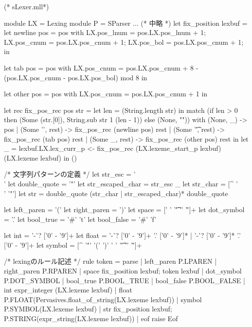 \documentclass[mingoth,a4paper]{jsarticle}
\begin{document}
\begin{commandline}
{
  (* sLexer.mll*)

  module LX = Lexing
  module P = SParser
  ... (* 中略 *)
  let fix_position lexbuf =
    let newline pos = {
      pos with
	LX.pos_lnum = pos.LX.pos_lnum + 1;
	LX.pos_cnum = pos.LX.pos_cnum + 1;
	LX.pos_bol = pos.LX.pos_cnum + 1;
    } in

    let tab pos = {
      pos with
	LX.pos_cnum = pos.LX.pos_cnum + 8 - (pos.LX.pos_cnum - pos.LX.pos_bol) mod 8
    } in

    let other pos = {
      pos with
	LX.pos_cnum = pos.LX.pos_cnum + 1
    } in

    let rec fix_pos_rec pos str =
      let len = (String.length str) in
	match (if len > 0 then (Some (str.[0]), String.sub str 1 (len - 1))
	       else (None, "")) with
	    (None, _) -> pos
	  | (Some '\n', rest) -> fix_pos_rec (newline pos) rest
	  | (Some '\t', rest) -> fix_pos_rec (tab pos) rest
	  | (Some _, rest) -> fix_pos_rec (other pos) rest
    in
    let _ = lexbuf.LX.lex_curr_p <- fix_pos_rec (LX.lexeme_start_p lexbuf) (LX.lexeme lexbuf) in
      ()
}

/* 文字列パターンの定義 */
let str_esc = '\\'
let double_quote = '"'
let str_escaped_char = str_esc _
let str_char = [^ '\\' '"']
let str = double_quote (str_char | str_escaped_char)* double_quote

let left_paren = '('
let right_paren = ')'
let space = [' ' '\t' '\n' '\r']+
let dot_symbol = '.'
let bool_true  = '#' 't'
let bool_false = '#' 'f'

let int = '-'? ['0' - '9']+
let float = '-'? ['0' - '9']+ '.' ['0' - '9']* | '-'? ['0' - '9']* '.' ['0' - '9']+
let symbol = [^ '"' '(' ')' ' ' '\t' '\n' '\r']+

/* lexingのルール記述 */
rule token = parse
  | left_paren      { P.LPAREN }
  | right_paren     { P.RPAREN }
  | space      { fix_position lexbuf; token lexbuf }
  | dot_symbol      { P.DOT_SYMBOL }
  | bool_true       { P.BOOL_TRUE }
  | bool_false      { P.BOOL_FALSE }
  | int      { expr_integer (LX.lexeme lexbuf) }
  | float    { P.FLOAT(Pervasives.float_of_string(LX.lexeme lexbuf)) }
  | symbol   { P.SYMBOL(LX.lexeme lexbuf) }
  | str      { fix_position lexbuf; P.STRING(expr_string(LX.lexeme lexbuf)) }
  | eof      { raise Eof }

\end{commandline}

\end{document}

